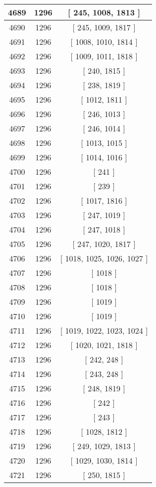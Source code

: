 \begin{center}
\begin{longtable}[H]{|| c c c ||}
\hline
4689 & 1296 & [ 245, 1008, 1813 ] \\ 
\hline
4690 & 1296 & [ 245, 1009, 1817 ] \\ 
\hline
4691 & 1296 & [ 1008, 1010, 1814 ] \\ 
\hline
4692 & 1296 & [ 1009, 1011, 1818 ] \\ 
\hline
4693 & 1296 & [ 240, 1815 ] \\ 
\hline
4694 & 1296 & [ 238, 1819 ] \\ 
\hline
4695 & 1296 & [ 1012, 1811 ] \\ 
\hline
4696 & 1296 & [ 246, 1013 ] \\ 
\hline
4697 & 1296 & [ 246, 1014 ] \\ 
\hline
4698 & 1296 & [ 1013, 1015 ] \\ 
\hline
4699 & 1296 & [ 1014, 1016 ] \\ 
\hline
4700 & 1296 & [ 241 ] \\ 
\hline
4701 & 1296 & [ 239 ] \\ 
\hline
4702 & 1296 & [ 1017, 1816 ] \\ 
\hline
4703 & 1296 & [ 247, 1019 ] \\ 
\hline
4704 & 1296 & [ 247, 1018 ] \\ 
\hline
4705 & 1296 & [ 247, 1020, 1817 ] \\ 
\hline
4706 & 1296 & [ 1018, 1025, 1026, 1027 ] \\ 
\hline
4707 & 1296 & [ 1018 ] \\ 
\hline
4708 & 1296 & [ 1018 ] \\ 
\hline
4709 & 1296 & [ 1019 ] \\ 
\hline
4710 & 1296 & [ 1019 ] \\ 
\hline
4711 & 1296 & [ 1019, 1022, 1023, 1024 ] \\ 
\hline
4712 & 1296 & [ 1020, 1021, 1818 ] \\ 
\hline
4713 & 1296 & [ 242, 248 ] \\ 
\hline
4714 & 1296 & [ 243, 248 ] \\ 
\hline
4715 & 1296 & [ 248, 1819 ] \\ 
\hline
4716 & 1296 & [ 242 ] \\ 
\hline
4717 & 1296 & [ 243 ] \\ 
\hline
4718 & 1296 & [ 1028, 1812 ] \\ 
\hline
4719 & 1296 & [ 249, 1029, 1813 ] \\ 
\hline
4720 & 1296 & [ 1029, 1030, 1814 ] \\ 
\hline
4721 & 1296 & [ 250, 1815 ] \\ 

\end{longtable}
\end{center}
